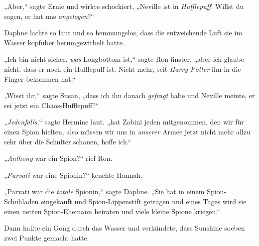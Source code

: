 „Aber,“ sagte Ernie und wirkte schockiert, „Neville ist in \emph{Hufflepuff}! Willst du sagen, er hat uns \emph{angelogen}?“

Daphne lachte so laut und so hemmungslos, dass die entweichende Luft sie im Wasser kopfüber herumgewirbelt hatte.

„Ich bin nicht sicher, \emph{was} Longbottom ist,“ sagte Ron finster, „aber ich glaube nicht, dass er noch ein Hufflepuff ist. Nicht mehr, seit \emph{Harry Potter} ihn in die Finger bekommen hat.“

„Wisst ihr,“ sagte Susan, „dass ich ihn danach \emph{gefragt} habe und Neville meinte, er sei jetzt ein Chaos-Hufflepuff?“

„\emph{Jedenfalls},“ sagte Hermine laut. „hat Zabini jeden mitgenommen, den wir für einen Spion hielten, also müssen wir uns in \emph{unserer} Armee jetzt nicht mehr allzu sehr über die Schulter schauen, hoffe ich.“

„\emph{Anthony} war ein Spion?“ rief Ron.

„\emph{Parvati} war eine Spionin?“ keuchte Hannah.

„Parvati war die \emph{totale} Spionin,“ sagte Daphne. „Sie hat in einem Spion-Schuhladen eingekauft und Spion-Lippenstift getragen und eines Tages wird sie einen netten Spion-Ehemann heiraten und viele kleine Spione kriegen.“

Dann hallte ein Gong durch das Wasser und verkündete, dass Sunshine soeben zwei Punkte gemacht hatte.

